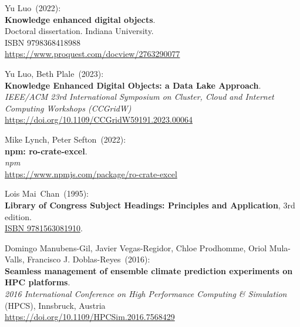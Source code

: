 \begin{thebibliography}{9}
Yu Luo~(2022): \\
\textbf{Knowledge enhanced digital objects}.\\
Doctoral dissertation. Indiana University.\\
ISBN 9798368418988 \\
\url{https://www.proquest.com/docview/2763290077}

Yu Luo, Beth Plale~(2023): \\
\textbf{Knowledge Enhanced Digital Objects: a Data Lake Approach}.\\
\emph{IEEE/ACM 23rd International Symposium on Cluster, Cloud and Internet Computing Workshops (CCGridW)}\\
\url{https://doi.org/10.1109/CCGridW59191.2023.00064}

Mike Lynch, Peter Sefton~(2022): \\
\textbf{npm: ro-crate-excel}.\\
\emph{npm} \\
\url{https://www.npmjs.com/package/ro-crate-excel}


Lois Mai~Chan~(1995): \\
\textbf{Library of Congress Subject Headings: Principles and Application}, 3rd edition.\\
\href{https://identifiers.org/isbn/9781563081910}{ISBN 9781563081910}.

Domingo Manubens-Gil, Javier Vegas-Regidor, Chloe Prodhomme, Oriol Mula-Valls, Francisco J. Doblas-Reyes~(2016): \\
\textbf{Seamless management of ensemble climate prediction experiments on HPC platforms}.\\
\emph{2016 International Conference on High Performance Computing \& Simulation} (HPCS), Innsbruck, Austria \\
\url{https://doi.org/10.1109/HPCSim.2016.7568429}


\end{thebibliography}
